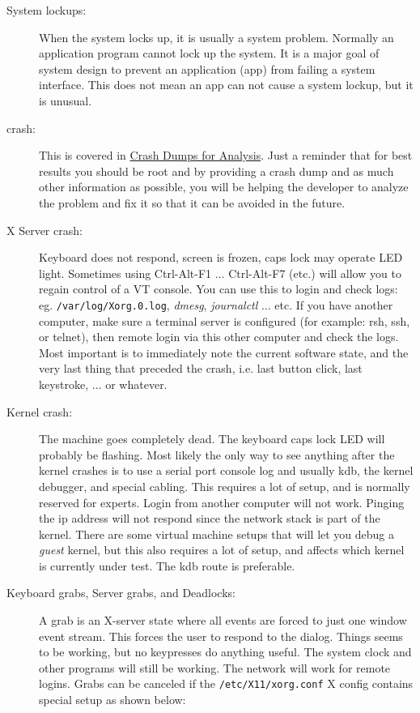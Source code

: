 \begin{description}
	\item[System lockups:] When the system locks up, it is usually a system problem.  Normally an application program cannot lock up the system.  It is a major goal of system design to prevent an application (app) from failing a system interface.  This does not mean an app can not cause a system lockup, but it is unusual.
	\item[\CGG{} crash:] This is covered in  \hyperref[cha:crash_dumps_analysis]{Crash Dumps for Analysis}.  Just a reminder that for best results you should be root and by providing a crash dump and as much other information as possible, you will be helping the developer to analyze the problem and fix it so that it can be avoided in the future.
	\item[X Server crash:] Keyboard does not respond, screen is frozen, caps lock may operate LED light.  Sometimes using Ctrl-Alt-F1 $\dots$ Ctrl-Alt-F7 (etc.) will allow you to regain control of a VT console.  You can use this to login and check logs: eg. \texttt{/var/log/Xorg.0.log}, \textit{dmesg}, \textit{journalctl} $\dots$ etc.  If you have another computer, make sure a terminal server is configured (for example: rsh, ssh, or telnet), then remote login via this other computer and check the logs.  Most important is to immediately note the current software state, and the very last thing that preceded the crash, i.e. last button click, last keystroke, $\dots$ or whatever.
	\item[Kernel crash:] The machine goes completely dead.  The keyboard caps lock LED will probably be flashing.  Most likely the only way to see anything after the kernel crashes is to use a serial port console log and usually kdb, the kernel debugger, and special cabling.  This requires a lot of setup, and is normally reserved for experts.  Login from another computer will not work.  Pinging the ip address will not respond since the network stack is part of the kernel.  There are some virtual machine setups that will let you debug a \textit{guest} kernel, but this also requires a lot of setup, and affects which kernel is currently under test.  The kdb route is preferable.
	\item[Keyboard grabs, Server grabs, and Deadlocks:] A grab is an X-server state where all events are forced to just one window event stream.  This forces the user to respond to the dialog.  Things seems to be working, but no keypresses do anything useful. The system clock and other programs will still be working.  The network will work for remote logins. Grabs can be canceled if the \texttt{/etc/X11/xorg.conf} X config contains special setup as shown below:
\end{description}


